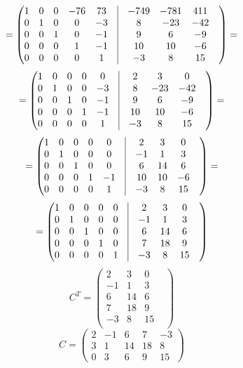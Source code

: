 \documentclass[a4paper,12pt]{article}
\begin{document}
\[
=
\begin{pmatrix}
1 & 0 & 0 & -76 & 73 & \vrule &-749 & -781 & 411 & \\
0 & 1 & 0 & 0 & -3 & \vrule &8 & -23 & -42 & \\
0 & 0 & 1 & 0 & -1 & \vrule &9 & 6 & -9 & \\
0 & 0 & 0 & 1 & -1 & \vrule &10 & 10 & -6 & \\
0 & 0 & 0 & 0 & 1 & \vrule &-3 & 8 & 15 & \\
\end{pmatrix}
=
\]
\[
=
\begin{pmatrix}
1 & 0 & 0 & 0 & 0 & \vrule &2 & 3 & 0 & \\
0 & 1 & 0 & 0 & -3 & \vrule &8 & -23 & -42 & \\
0 & 0 & 1 & 0 & -1 & \vrule &9 & 6 & -9 & \\
0 & 0 & 0 & 1 & -1 & \vrule &10 & 10 & -6 & \\
0 & 0 & 0 & 0 & 1 & \vrule &-3 & 8 & 15 & \\
\end{pmatrix}
=
\]
\[
=
\begin{pmatrix}
1 & 0 & 0 & 0 & 0 & \vrule &2 & 3 & 0 & \\
0 & 1 & 0 & 0 & 0 & \vrule &-1 & 1 & 3 & \\
0 & 0 & 1 & 0 & 0 & \vrule &6 & 14 & 6 & \\
0 & 0 & 0 & 1 & -1 & \vrule &10 & 10 & -6 & \\
0 & 0 & 0 & 0 & 1 & \vrule &-3 & 8 & 15 & \\
\end{pmatrix}
=
\]
\[
=
\begin{pmatrix}
1 & 0 & 0 & 0 & 0 & \vrule &2 & 3 & 0 & \\
0 & 1 & 0 & 0 & 0 & \vrule &-1 & 1 & 3 & \\
0 & 0 & 1 & 0 & 0 & \vrule &6 & 14 & 6 & \\
0 & 0 & 0 & 1 & 0 & \vrule &7 & 18 & 9 & \\
0 & 0 & 0 & 0 & 1 & \vrule &-3 & 8 & 15 & \\
\end{pmatrix}
\]
\[
C^T= 
\begin{pmatrix}
2 & 3 & 0 & \\
-1 & 1 & 3 & \\
6 & 14 & 6 & \\
7 & 18 & 9 & \\
-3 & 8 & 15 & \\
\end{pmatrix}
\]
\[
C = 
\begin{pmatrix}
2 & -1 & 6 & 7 & -3 \\
3 & 1 & 14 & 18 & 8 \\
0 & 3 & 6 & 9 & 15
\end{pmatrix}
\]
\end{document}
